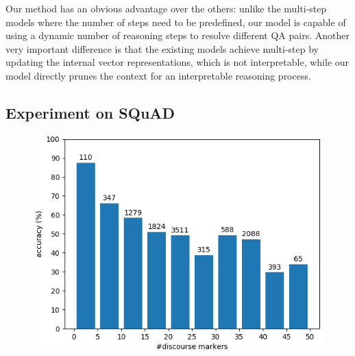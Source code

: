 Our method has an obvious advantage over the others: unlike the multi-step models where the number of steps need to be predefined, our model is capable of using a dynamic number of reasoning steps to resolve different QA pairs. Another very important difference is that the existing models achieve multi-step by updating the internal vector representations, which is not interpretable, while our model directly prunes the context for an interpretable reasoning process.

\subsection{Experiment on SQuAD}

\begin{figure}
 \centering
 \includegraphics[width=0.9\linewidth]{fig/squad.png}
 \caption{}
 \label{fig:squad}
\vspace{-2ex}
\end{figure}

